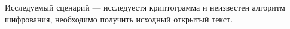 Исследуемый сценарий --- исследуестя криптограмма и неизвестен
алгоритм шифрования, необходимо получить исходный открытый
текст.

